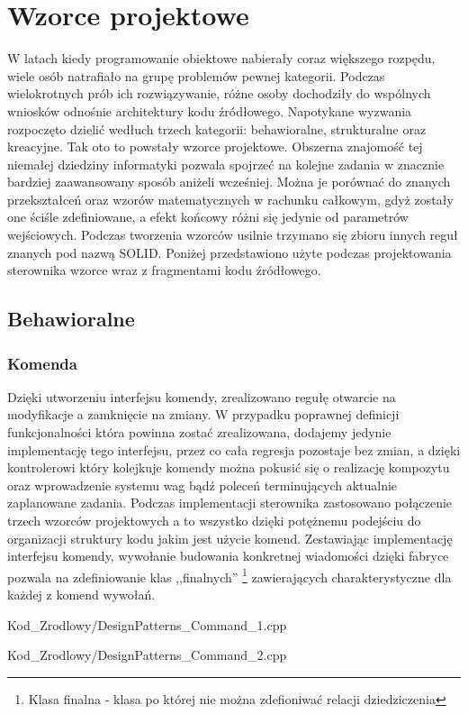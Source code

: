 \chapter{Wzorce projektowe}
W latach kiedy programowanie obiektowe nabierały coraz większego rozpędu, wiele osób natrafiało na grupę problemów pewnej kategorii.
Podczas wielokrotnych prób ich rozwiązywanie, różne osoby dochodziły do wspólnych wniosków odnośnie architektury kodu źródłowego.
Napotykane wyzwania rozpoczęto dzielić wedłuch trzech kategorii: behawioralne, strukturalne oraz kreacyjne. Tak oto to powstały wzorce projektowe.
Obszerna znajomość tej niemałej dziedziny informatyki pozwala spojrzeć na kolejne zadania w znacznie bardziej zaawansowany sposób aniżeli wcześniej.
Można je porównać do znanych przekształceń oraz wzorów matematycznych w rachunku całkowym, gdyż zostały one ściśle zdefiniowane, a efekt końcowy różni się
jedynie od parametrów wejściowych. Podczas tworzenia wzorców usilnie trzymano się zbioru innych reguł znanych pod nazwą SOLID. \newline
Poniżej przedstawiono użyte podczas projektowania sterownika wzorce wraz z fragmentami kodu źródłowego.
\section{Behawioralne}
    \subsection{Komenda}
        Dzięki utworzeniu interfejsu komendy, zrealizowano regułę otwarcie na modyfikacje a zamknięcie na zmiany.
        W przypadku poprawnej definicji funkcjonalności która powinna zostać zrealizowana, dodajemy jedynie implementację tego interfejsu,
        przez co cała regresja pozostaje bez zmian, a dzięki kontrolerowi który kolejkuje komendy można pokusić się o realizację kompozytu oraz
        wprowadzenie systemu wag bądź poleceń terminujących aktualnie zaplanowane zadania.
        Podczas implementacji sterownika zastosowano połączenie trzech wzorców projektowych a to wszystko dzięki potężnemu podejściu do organizacji
        struktury kodu jakim jest użycie komend. Zestawiając implementację interfejsu komendy, wywołanie budowania konkretnej wiadomości dzięki fabryce
        pozwala na zdefiniowanie klas ,,finalnych''
        \footnote{\label{Klasa finalna} Klasa finalna - klasa po której nie można zdefioniwać relacji dziedziczenia} 
        zawierających charakterystyczne dla każdej z komend wywołań. 
        
            {Kod_Zrodlowy/DesignPatterns_Command_1.cpp}
        
            {Kod_Zrodlowy/DesignPatterns_Command_2.cpp}
    \newpage
